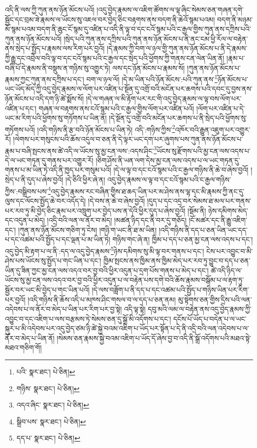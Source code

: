 འདི་ནི་ལས་ཀྱི་ཀུན་ནས་ཉོན་མོངས་པའོ། །འདུ་བྱེད་རྣམས་ལ་འཇིག་ཚོགས་ལ་ལྟ་ཞིང་སེམས་ཅན་གཞན་དགེ་སྦྱོང་དང་བྲམ་ཟེ་རྣམས་ལ་ཡོངས་སུ་འཇལ་བར་བྱེད་ཅིང་བརྟགས་ནས་བདག་ནི་ཆེའོ་སྙམ་པའམ། བདག་ནི་མཉམ་མོ་སྙམ་པའམ་བདག་ནི་ཆུང་ངོ་སྙམ་དུ་འཛིན་པ་འདི་ནི་ལྟ་བ་དང་ངའོ་སྙམ་པའི་ང་རྒྱལ་གྱིས་ཀུན་ནས་དཀྲིས་པའི་ཀུན་ནས་ཉོན་མོངས་པའོ། །སྲེད་པའི་ཀུན་ནས་དཀྲིས་པའི་ཀུན་ནས་ཉོན་མོངས་པ་ནི་ནང་ངམ་ཕྱི་རོལ་ལ་བརྟེན་ནས་སྲེད་པ་སྤྱོད་པ་རྣམས་ལས་རིག་པར་བྱའོ། །དེ་རྣམས་ཀྱི་བག་ལ་ཉལ་གྱི་ཀུན་ནས་ཉོན་མོངས་པ་ནི་དེ་རྣམས་ཀྱི་རྒྱུ་དང་འབྲེལ་བའི་ལྟ་བ་དང་ངའོ་སྙམ་པའི་ང་རྒྱལ་དང་སྲེད་པའི་ཕྱོགས་ཀྱི་གནས་ངན་ལེན་ཡིན་ནོ། །རྣམ་པ་བཞི་པོ་དེ་རྣམས་ནི་བསྡུས་ན་གཉིས་སུ་འགྱུར་ཏེ། ལས་དང་ཉོན་མོངས་པ་རྣམས་སོ། །ཀུན་ནས་ཉོན་མོངས་པ་རྣམས་ཀྱང་ཀུན་ནས་དཀྲིས་པ་དང་། བག་ལ་ཉལ་ལོ། །དེ་མ་ཡིན་པའི་ཉོན་མོངས་:པའི་ཀུན་ནས་\footnote{པའི་  སྣར་ཐང་།  པེ་ཅིན། }ཉོན་མོངས་པ་ཡང་ཡོད་མོད་ཀྱི་འདུ་བྱེད་རྣམས་ལ་ལོག་པར་འཛིན་པ་སྔོན་དུ་འགྲོ་བའི་མངོན་པར་ཆགས་པའི་དབང་དུ་བྱས་ནས་ཉོན་མོངས་པ་འདི་དག་ཉི་ཚེ་སྨོས་སོ། །དེ་ལ་གཞན་ལ་མི་རྟོག་པར་རང་གི་འདུ་བྱེད་རྣམས་ལ་ལྟ་བས་ལོག་པར་འཛིན་པ་དང་། གཞན་ལ་བརྟགས་ནས་ངའོ་སྙམ་པའི་ང་རྒྱལ་གྱིས་ལོག་པར་འཛིན་པའོ། །ལོག་པར་འཛིན་པ་དེ་ཡང་མ་རིག་པའི་ཕྱོགས་སུ་གཏོགས་པ་ཡིན་ནོ། །དེ་སྔོན་དུ་འགྲོ་བའི་མངོན་པར་ཆགས་པ་ནི་སྲེད་པའི་ཕྱོགས་སུ་གཏོགས་པའོ། །འདི་གཉིས་ནི་རྩ་བའི་ཉོན་མོངས་པ་ཡིན་ཏེ། འདི་:གཉིས་ཀྱིས་\footnote{གཉིས་  སྣར་ཐང་།  པེ་ཅིན། }འཁོར་བའི་རྒྱུན་འཇུག་པར་འགྱུར་རོ། །ལེགས་པར་གསུངས་པའི་ཆོས་འདུལ་བ་ཅན་ནི་དེ་ལྟར་ཡང་དག་པར་ཞུགས་པས་ཀུན་ནས་ཉོན་མོངས་པ་རྣམ་པ་བཞི་སྤངས་ནས་ཚེ་འདི་ལ་ཡོངས་སུ་མྱ་ངན་ལས་:འདས་ཤིང་\footnote{འདའ་ཞིང་  སྣར་ཐང་།  པེ་ཅིན། }ཡོངས་སུ་རྫོགས་པའི་མྱ་ངན་ལས་འདས་པ་དེ་ལ་ཡང་གཏན་དུ་གནས་པར་འགྱུར་རོ། །ཅིག་ཤོས་ནི་ཡན་ལག་དེས་མྱ་ངན་ལས་འདས་པ་ལ་ཡང་གཏན་དུ་གནས་པ་མ་ཡིན་ཏེ་འདི་ནི་ཁྱད་པར་གསུམ་པའོ། །དེ་ལ་ལྟ་བ་དང་ངའོ་སྙམ་པའི་ང་རྒྱལ་གཉིས་ནི་ཆེ་བ་ཞེས་བྱའོ། །སྲེད་པ་ནི་དུད་པ་ཞེས་བྱའོ། །དེ་ཅིའི་ཕྱིར་ཞེ་ན། འདུ་བྱེད་རྣམས་ལ་ལྟ་བ་དང་ངའོ་སྙམ་པའི་ང་རྒྱལ་གཉིས་ཀྱིས་:བསྒྲིབས་པས་\footnote{སྒྲིབ་པས་  སྣར་ཐང་།  པེ་ཅིན། }འདུ་བྱེད་རྣམས་རང་བཞིན་གྱིས་ཐ་ཆད་ཡིན་པར་མ་ཤེས་ནས་ལྷ་དང་མི་རྣམས་ཀྱི་ནང་དུ་ལུས་དང་ལོངས་སྤྱོད་ཆེ་བར་འདོད་དེ། །དེ་བས་ན་ཆེ་བ་ཞེས་བྱའོ། །དུད་པ་དང་འདྲ་བར་སེམས་ཐ་མལ་པར་གནས་པར་རབ་ཏུ་མི་བྱེད་ཅིང་རྣམ་པར་འཁྲུག་པར་བྱེད་པས་ན་དེའི་ཕྱིར་དུད་པ་ཞེས་བྱའོ། །སྡོམ་ནི། ཉེས་དམིགས་མེད་དང་འདུན་པ་མེད། །འདྲི་བའི་ལན་ལ་ནོར་བ་མེད། །མཚན་ཉིད་དང་ནི་བར་དུ་གཅོད། །ངོ་མཚར་དང་ནི་རྒྱུ་འཇིག་དང་། །ཀུན་ནས་ཉོན་མོངས་གཅིག་ཏུ་ངེས། །གཉི་ག་ཡང་ནི་ཐ་མ་ཡིན། །འདི་གཉིས་ནི་དད་པ་ཅན་ཡིན་ཡང་དད་པ་དང་འཚམ་པའི་སྤྱོད་པ་དང་ལྡན་པ་མ་ཡིན་ཏེ། གཉིས་གང་ཞེ་ན། ཁྱིམ་པ་དད་པ་ཅན་མྱ་ངན་ལས་འདས་པ་དང་། འདུ་བྱེད་མི་རྟག་པ་ལ་ནི་:དད་ལ་འདུ་བྱེད་རྣམས་\footnote{དད་པ་  སྣར་ཐང་།  པེ་ཅིན། }ཉེས་དམིགས་སུ་མི་ལྟ་བར་གནས་པ་དང་། ངེས་པར་འབྱུང་བ་མི་ཤེས་པས་ཡོངས་སུ་སྤྱོད་པ་གང་ཡིན་པ་དང་། ཁྱིམ་སྤངས་ནས་ཁྱིམ་ནས་ཁྱིམ་མེད་པར་རབ་ཏུ་བྱུང་བ་དད་པ་ཅན་ཡིན་དུ་ཟིན་ཀྱང་མྱ་ངན་ལས་འདའ་བར་བྱ་བའི་ཕྱིར་འདུན་པ་དྲག་པོས་གནས་པ་མེད་པ་དང་། ཚེ་འདི་ཉིད་ལ་ཡོངས་སུ་མྱ་ངན་ལས་འདའ་བར་བྱ་བའི་ཕྱིར་འདུན་པ་ལ་བརྟེན་པས་དགེ་བའི་ཆོས་རྣམས་བསྒོམ་པ་ལ་རྟག་ཏུ་སྦྱོར་བར་ཡང་མི་བྱེད་པ་གང་ཡིན་པའོ། །དེ་ལས་བཟློག་པ་ནི་དད་པ་དང་འཚམ་པའི་སྤྱོད་པ་གཉིས་ཡིན་པར་རིག་པར་བྱའོ། །འདི་གཉིས་ནི་ཆོས་འདི་པ་མཁས་ཤིང་གསལ་བ་ལ་དད་པ་ཅན་ནམ། མུ་སྟེགས་ཅན་གྱིས་དྲིས་པའི་ལན་འདེབས་པ་ལ་ནོར་བ་མེད་པ་ཡིན་པར་རིག་པར་བྱ་སྟེ། འདི་ལྟ་སྟེ། དབུ་མའི་ལམ་ལ་བརྟེན་ནས་འདུ་བྱེད་རྣམས་ཀྱི་འབྱུང་བ་དང་འཇིག་པ་ལས་བརྩམས་ཏེ་སེམས་ཅན་དུ་སྒྲོ་མི་འདོགས་པ་དང་། དངོས་པོ་ཡོད་པ་བདེན་པ་ལ་ཡང་སྐུར་པ་མི་འདེབས་པར་འདུ་བྱེད་ཙམ་ཉི་ཚེ་སྐྱེ་བའམ་འཇིག་པ་ཡོད་པར་སྟོན་པ་དེ་ནི་འདྲི་བའི་ལན་འདེབས་པ་ལ་ནོར་བ་མེད་པ་ཡིན་ནོ། །སེམས་ཅན་རྣམས་སྐྱེ་བའམ་འཇིག་པ་ཡོད་དོ་ཞེས་བྱ་བ་འདི་ནི་སྒྲོ་འདོགས་པའི་མཐའ་སྟེ་མཐའ་གཅིག་གོ། 